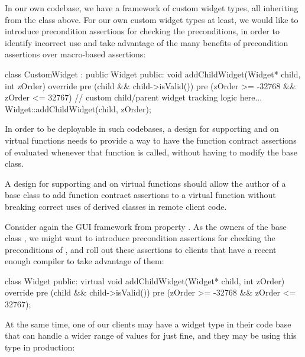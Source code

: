 In our own codebase, we have a framework of custom widget types, all inheriting from the  class above. For our own custom widget types at least, we would like to introduce precondition assertions for checking the preconditions, in order to identify incorrect use and take advantage of the many benefits of precondition assertions over macro-based assertions:
\begin{codeblock}
class CustomWidget : public Widget {
public:
  void addChildWidget(Widget* child, int zOrder) override
    pre (child && child->isValid())
    pre (zOrder >= -32768 && zOrder <= 32767) 
  {
    // custom child/parent widget tracking logic here...
    Widget::addChildWidget(child, zOrder);
  }
}
\end{codeblock}
In order to be deployable in such codebases, a design for supporting  and  on virtual functions needs to provide a way to have the function contract assertions of \allowbreak{} evaluated whenever that function is called, without having to modify the   base class.



A design for supporting  and  on virtual functions should allow the author of a base class to add function contract assertions to a virtual function without breaking correct uses of derived classes in remote client code.

Consider again the GUI framework from property . As the owners of the base class , we might want to introduce precondition assertions for checking the preconditions of \allowbreak{}, and roll out these assertions to clients that have a recent enough compiler to take advantage of them: 

\begin{codeblock}
class Widget {
public:
  virtual void addChildWidget(Widget* child, int zOrder) override
    pre (child && child->isValid())
    pre (zOrder >= -32768 && zOrder <= 32767);
}
\end{codeblock}

At the same time, one of our clients may have a widget type in their code base that can handle a wider range of values for  just fine, and they may be using this type in production:

